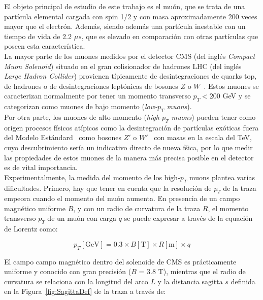 
El objeto principal de estudio de este trabajo es el mu\'on, que se trata de una part\'icula elemental cargada con spin 1/2 y con masa aproximadamente 200 veces mayor que el electr\'on. Adem\'as, siendo adem\'as una part\'icula inestable con un tiempo de vida de 2.2 $\mu s$, que es elevado en comparaci\'on con otras part\'iculas que poseen esta caracter\'istica. \\

La mayor parte de los muones medidos por el detector CMS (del ingl\'es \textit{Compact Muon Solenoid}) situado en el gran colisionador de hadrones LHC (del ingl\'es \textit{Large Hadron Collider}) provienen t\'ipicamente de desintegraciones de quarks top, de hadrones o de desintegraciones lept\'onicas de bosones $Z$ o $W$~\cite{PhysRevD.98.030001}. Estos muones se caracterizan normalmente por tener un momento transverso $p_{T} < 200$ GeV y se categorizan como muones de bajo momento (\textit{low-$p_{T}$ muons}). \\
Por otra parte, los muones de alto momento (\textit{high-$p_{T}$ muons}) pueden tener como origen procesos f\'isicos at\'ipicos como la desintegraci\'on de part\'iculas ex\'oticas fuera del Modelo Est\'andard~\cite{gaillard1999standard} como bosones $Z'$ o $W'$~\cite{CMS-PAS-EXO-19-019,2017278} con masas en la escala del TeV, cuyo descubrimiento ser\'ia un indicativo directo de nueva f\'sica, por lo que medir las propiedades de estos muones de la manera m\'as precisa posible en el detector es de vital importancia. \\

Experimentalmente, la medida del momento de los high-$p_{T}$ muons plantea varias dificultades. Primero, hay que tener en cuenta que la resoluci\'on de $p_{T}$ de la traza empeora cuando el momento del mu\'on aumenta.
En presencia de un campo magn\'etico uniforme $B$, y con un radio de curvatura de la traza $R$, el momento transverso $p_{T}$ de un mu\'on con carga $q$ se puede expresar a trav\'es de la equaci\'on de Lorentz como:

\begin{equation}
  p_{T}[\text{GeV}] = 0.3 \times B[\text{T}] \times R[\text{m}] \times q
\label{eq:pTvsRadius}
\end{equation}

El campo campo magn\'etico dentro del solenoide de CMS es pr\'acticamente uniforme y conocido con gran precisi\'on ($B$ = 3.8 T), mientras que el radio de curvatura se relaciona con la longitud del arco $L$ y la distancia sagitta $s$ definida en la Figura~\ref{fig:SagittaDef} de la traza a trav\'es de:

